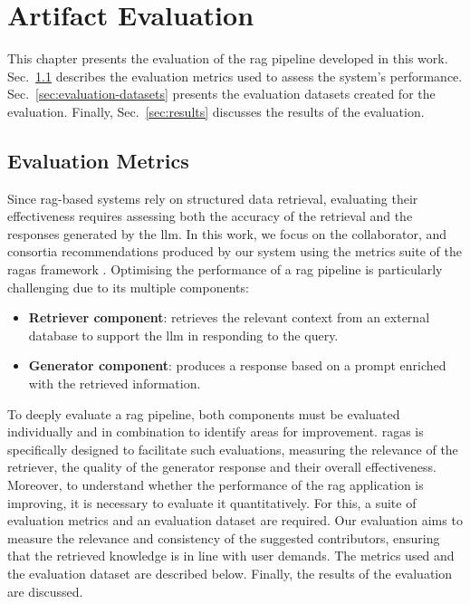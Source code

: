 \chapter{Artifact Evaluation}\label{chap:evaluation}

This chapter presents the evaluation of the \gls{rag} pipeline developed in this work.
Sec.~\ref{sec:evaluation-metrics} describes the evaluation metrics used to assess the system's performance.
Sec.~\ref{sec:evaluation-datasets} presents the evaluation datasets created for the evaluation.
Finally, Sec.~\ref{sec:results} discusses the results of the evaluation.

\section{Evaluation Metrics}\label{sec:evaluation-metrics}
Since \gls{rag}-based systems rely on structured data retrieval, evaluating their effectiveness requires assessing both the accuracy of the retrieval and the responses generated by the \gls{llm}.
In this work, we focus on the collaborator, and consortia recommendations produced by our system using the metrics suite of the \gls{ragas} framework \cite{ragas2024}.
Optimising the performance of a \gls{rag} pipeline is particularly challenging due to its multiple components:

\begin{itemize}
    \item \textbf{Retriever component}: retrieves the relevant context from an external database to support the \gls{llm} in responding to the query.
    \item \textbf{Generator component}: produces a response based on a prompt enriched with the retrieved information.
\end{itemize}

To deeply evaluate a \gls{rag} pipeline, both components must be evaluated individually and in combination to identify areas for improvement.
\gls{ragas} is specifically designed to facilitate such evaluations, measuring the relevance of the retriever, the quality of the generator response and their overall effectiveness.
Moreover, to understand whether the performance of the \gls{rag} application is improving, it is necessary to evaluate it quantitatively.
For this, a suite of evaluation metrics and an evaluation dataset are required.
Our evaluation aims to measure the relevance and consistency of the suggested contributors, ensuring that the retrieved knowledge is in line with user demands.
The metrics used and the evaluation dataset are described below.
Finally, the results of the evaluation are discussed.

